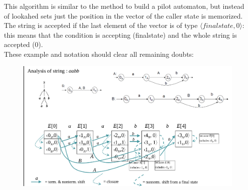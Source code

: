 			This algorithm is similar to the method to build a pilot automaton, but instead of lookahed sets just the position in the vector of the caller state is memorized. The string is accepted if the last element of the vector is of type $\langle finalstate, 0 \rangle$: this means that the condition is accepting (finalstate) and the whole string is accepted (0).\\
			These example and notation should clear all remaining doubts:
			\begin{figure}[H]
				\centering
				\includegraphics[width = \textwidth]{./images/exEarley.png}
			\end{figure}